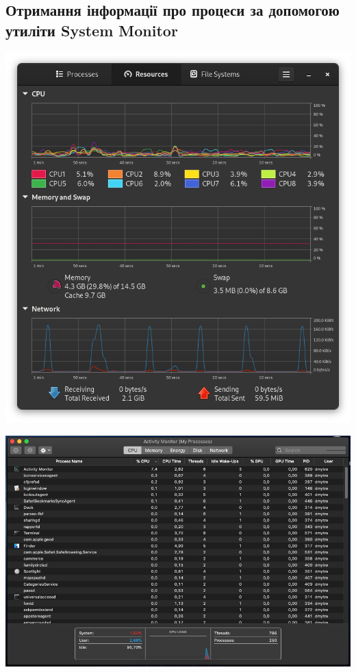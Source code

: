 \documentclass{article}
\begin{document}
\begin{normalsize}
	\section*{Отримання інформації про процеси за допомогою утиліти System Monitor}
	\begin{center}
		\includegraphics[scale=0.5]{sm1}
	\end{center}
	\begin{center}
		\includegraphics[scale=0.5]{sm2}
	\end{center}

\end{normalsize}
\end{document}
